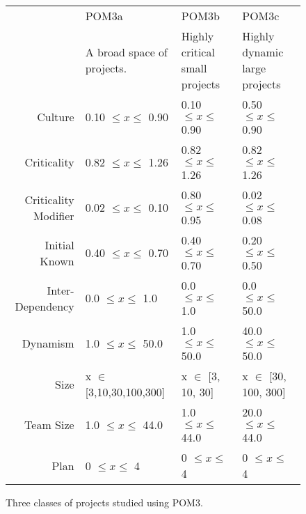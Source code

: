 \documentclass[10pt,journal,compsoc]{IEEEtran}
\begin{document}
\begin{figure*}%
\footnotesize
\begin{center}
    \begin{tabular}{r|p{1.5in}|p{1.5in}|p{1.5in}}
                     & POM3a                         & POM3b             &POM3c       \\ 
                             & A broad space of projects. & Highly critical small projects& Highly dynamic large projects\\\hline
        Culture              & 0.10 $\leq x \leq$ 0.90       & 0.10 $\leq x \leq$ 0.90  & 0.50 $\leq x \leq$ 0.90  \\ 
        Criticality          & 0.82 $\leq x \leq$ 1.26       & 0.82 $\leq x \leq$ 1.26   & 0.82 $\leq x \leq$ 1.26  \\ 
        Criticality Modifier & 0.02 $\leq x \leq$ 0.10       & 0.80 $\leq x \leq$ 0.95 & 0.02 $\leq x \leq$ 0.08   \\ 
        Initial Known        & 0.40 $\leq x \leq$ 0.70       & 0.40 $\leq x \leq$ 0.70  & 0.20 $\leq x \leq$ 0.50  \\ 
        Inter-Dependency     & 0.0   $\leq x \leq$ 1.0       & 0.0   $\leq x \leq$ 1.0  & 0.0   $\leq x \leq$ 50.0 \\ 
        Dynamism             & 1.0   $\leq x \leq$ 50.0      & 1.0   $\leq x \leq$ 50.0  & 40.0   $\leq x \leq$ 50.0 \\ 
        Size                 & x $\in$ [3,10,30,100,300] & x $\in$ [3, 10, 30]     & x $\in$ [30, 100, 300]   \\ 
        Team Size            & 1.0 $\leq x \leq$ 44.0        & 1.0 $\leq x \leq$ 44.0  & 20.0 $\leq x \leq$ 44.0    \\ 
        Plan                 & 0 $\leq x \leq$ 4             & 0 $\leq x \leq$ 4    & 0 $\leq x \leq$ 4       
\end{tabular}
\end{center}

\caption{Three classes of projects studied using POM3. }\label{fig:POM3abcd}
\end{figure*}
\end{document}
